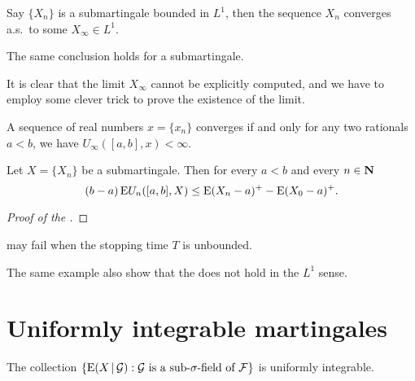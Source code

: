 \begin{namedthm} \label{thm:martingale-conv-thm}
    Say $\{X_n\}$ is a submartingale bounded in $L^1$, then the sequence $X_n$ converges a.s.\ to some $X_\infty \in L^1$.

    The same conclusion holds for a submartingale.
\end{namedthm}

It is clear that the limit $X_\infty$ cannot be explicitly computed, and we have to employ some clever trick to prove the existence of the limit. 

\begin{lem}
    A sequence of real numbers $x = \{x_n\}$ converges if and only for any two rationals $a < b$, we have $U_\infty([a,b],x) < \infty$.
\end{lem}

\begin{namedthm}
    Let $X = \{X_n\}$ be a submartingale. Then for every $a < b$ and every $n \in \mathbf{N}$
    \[
        (b - a)\mathop{}\!\mathrm{E} U_n([a,b],X) \leq \mathop{}\!\mathrm{E}(X_n - a)^+ - \mathop{}\!\mathrm{E}(X_0 - a)^+.
    \]
\end{namedthm}

\begin{proof}[Proof of the ]
    
\end{proof}

 may fail when the stopping time $T$ is unbounded.

The same example also show that the  does not hold in the $L^1$ sense.

\section{Uniformly integrable martingales}

\begin{prop} \label{prop:cond-expec-unif-int}
    The collection $\{\mathop{}\!\mathrm{E}(X \,|\, \mathcal{G}) : \mathcal{G} \text{ is a sub-$\sigma$-field of }\mathcal{F}\}$ is uniformly integrable.
\end{prop}

